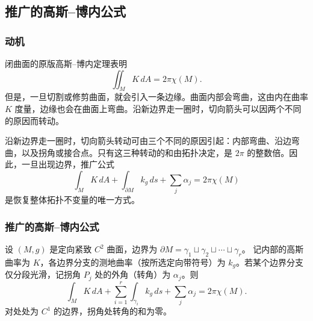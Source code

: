 \subsection{推广的高斯–博内公式}
\subsubsection{动机}
闭曲面的原版高斯–博内定理表明
\[
  \iint_M K\,dA=2\pi\chi(M).
\]
但是，一旦切割或修剪曲面，就会引入一条边缘。曲面内部会弯曲，这由内在曲率 $K$ 度量，边缘也会在曲面上弯曲。沿新边界走一圈时，切向箭头可以因两个不同的原因而转动。

沿新边界走一圈时，切向箭头转动可由三个不同的原因引起：内部弯曲、沿边弯曲，以及拐角或接合点。只有这三种转动的和由拓扑决定，是 $2\pi$ 的整数倍。因此，一旦出现边界，推广公式
\[
  \int_M K\,dA+\int_{\partial M}k_g\,ds+\sum_j\alpha_j=2\pi\chi(M)
\]
是恢复整体拓扑不变量的唯一方式。

\subsubsection{推广的高斯–博内公式}
设 $(M,g)$ 是定向紧致 $C^2$ 曲面，边界为
$\partial M=\gamma_1\sqcup\gamma_2\sqcup\cdots\sqcup\gamma_r$。
记内部的高斯曲率为 $K$，各边界分支的测地曲率（按所选定向带符号）为 $k_g$。若某个边界分支仅分段光滑，记拐角 $P_j$ 处的外角（转角）为 $\alpha_j$。则
\begin{equation*}
  \int_M K\,dA+\sum_{i=1}^r\int_{\gamma_i}k_g\,ds
    +\sum_j\alpha_j=2\pi\chi(M).
  \tag{5.27}\label{eq:5.27}
\end{equation*}
对处处为 $C^1$ 的边界，拐角处转角的和为零。


